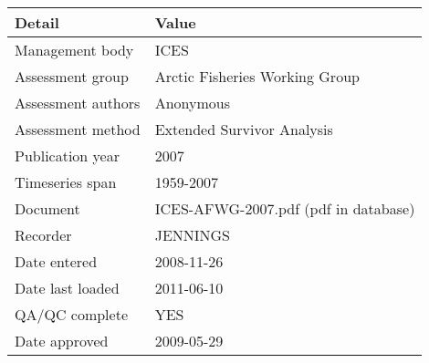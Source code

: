 \begin{table}[htb]
\centering
\begin{tabular}{lp{7cm}}
\toprule
Detail & Value \\
\midrule
Management body    & ICES                                 \\
Assessment group   & Arctic Fisheries Working Group       \\
Assessment authors & Anonymous                            \\
Assessment method  & Extended Survivor Analysis           \\
Publication year   & 2007                                 \\
Timeseries span    & 1959-2007                            \\
Document           & ICES-AFWG-2007.pdf (pdf in database) \\
Recorder           & JENNINGS                             \\
Date entered       & 2008-11-26                           \\
Date last loaded   & 2011-06-10                           \\
QA/QC complete     & YES                                  \\
Date approved      & 2009-05-29                           \\
\bottomrule
\end{tabular}
\label{tab:assessdet}
\end{table}
